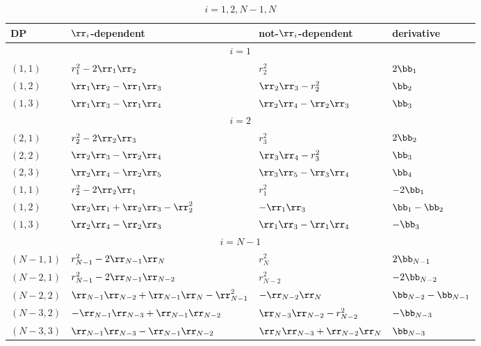 \begin{table}[ht]
  \centering
  \caption{$i=1,2,N-1,N$}
  \small
  \begin{tabular}{|p{2cm}|p{4cm}|p{4cm}|p{2.5cm}|}
\hline
    DP			& $\rr_i$-dependent 	& not-$\rr_i$-dependent & derivative \\
\hline
\multicolumn{4}{|c|}{$i=1$} \\ 
   \hline 
    $(1,1)$ 	& $r_1^2-2\rr_1\rr_{2}$ 	
    		& $r_{2}^2$ &
		$2\bb_1$ \\
    \hline
    $(1,2)$ 	& $\rr_1\rr_{2}-\rr_1\rr_{3}$  
    		& $\rr_{2}\rr_{3}-r_{2}^2$ 
		& $\bb_{2}$ \\
    \hline
    $(1,3)$		& $\rr_1\rr_{3}-\rr_{1}\rr_{4}$	
    			& $\rr_{2}\rr_{4}-\rr_{2}\rr_{3}$ 
			& $\bb_{3}$ \\
\hline
\multicolumn{4}{|c|}{$i=2$} \\ 
\hline
    $(2,1)$ 	& $r_2^2-2\rr_2\rr_{3}$ 	
    		& $r_{3}^2$ 
		& $2\bb_2$ \\
    \hline
    $(2,2)$ 	& $\rr_2\rr_{3}-\rr_2\rr_{4}$  
    		& $\rr_{3}\rr_{4}-r_{3}^2$ 
		& $\bb_{3}$ \\
    \hline
   $(2,3)$		& $\rr_2\rr_{4}-\rr_{2}\rr_{5}$	
    			& $\rr_{3}\rr_{5}-\rr_{3}\rr_{4}$ 
			& $\bb_{4}$ \\
    \hline
    $(1,1)$ 	& $r_{2}^2-2\rr_{2}\rr_{1}$	
    		& $r_{1}^2$ 
		& $-2\bb_{1}$\\
    \hline
    $(1,2)$ 	& $\rr_2\rr_{1}+\rr_2\rr_{3}-\rr_{2}^2$ 
    		& $-\rr_{1}\rr_{3}$ 
    		& $\bb_{1}-\bb_2$ \\
    \hline
   $(1,3)$		& $\rr_2\rr_{4}-\rr_2\rr_{3} $   	
    			& $\rr_{1}\rr_{3}-\rr_{1}\rr_{4}$ 
			& $-\bb_{3}$ \\
\hline
\multicolumn{4}{|c|}{$i=N-1$} \\ 
\hline
    $(N-1,1)$ 	& $r_{N-1}^2-2\rr_{N-1}\rr_{N}$ 	
    		& $r_{N}^2$ 
		& $2\bb_{N-1}$ \\
    \hline
    $(N-2,1)$ 	& $r_{N-1}^2-2\rr_{N-1}\rr_{N-2}$	
    		& $r_{N-2}^2$ 
		& $-2\bb_{N-2}$\\
    \hline
    $(N-2,2)$ 	& $\rr_{N-1}\rr_{N-2}+\rr_{N-1}\rr_{N}-\rr_{N-1}^2$ 
    		& $-\rr_{N-2}\rr_{N}$ 
		& $\bb_{N-2}-\bb_{N-1}$ \\
    \hline
    $(N-3,2)$ 	& $-\rr_{N-1}\rr_{N-3}+\rr_{N-1}\rr_{N-2}$ 
    		& $\rr_{N-3}\rr_{N-2}-r_{N-2}^2$ 
		& $-\bb_{N-3}$\\
    \hline
    $(N-3,3)$		& $\rr_{N-1}\rr_{N-3}-\rr_{N-1}\rr_{N-2}$ 	
    			& $\rr_{N}\rr_{N-3}+\rr_{N-2}\rr_{N}$ 
			& $\bb_{N-3}$ \\

\end{tabular}
\end{table}

